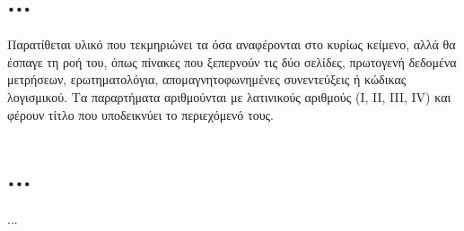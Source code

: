 \appendix
\renewcommand{\thesection}{\Roman{section}}
\section{...}

Παρατίθεται υλικό που τεκμηριώνει τα όσα αναφέρονται στο κυρίως κείμενο,
αλλά θα έσπαγε τη ροή του, όπως πίνακες που ξεπερνούν τις δύο σελίδες,
πρωτογενή δεδομένα μετρήσεων, ερωτηματολόγια, απομαγνητοφωνημένες
συνεντεύξεις ή κώδικας λογισμικού. Τα παραρτήματα αριθμούνται με λατινικούς
αριθμούς (I, II, III, IV) και φέρουν τίτλο που υποδεικνύει το περιεχόμενό
τους.

\section{...}

...
